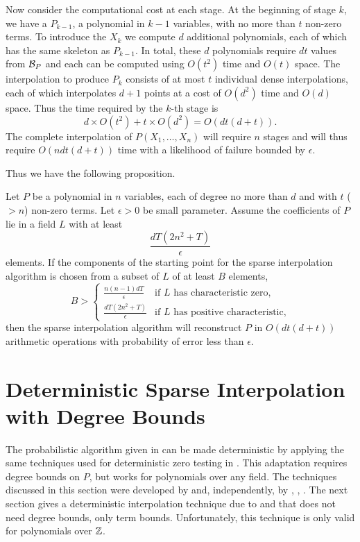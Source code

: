 Now consider the computational cost at each stage.  At the beginning
of stage $k$, we have a $P_{k-1}$, a polynomial in $k-1$ variables,
with no more than $t$ non-zero terms.  To introduce the $X_k$ we
compute $d$ additional polynomials, each of which has the same
skeleton as $P_{k-1}$.  In total, these $d$ polynomials require
$dt$ values from ${\cal B}_P$ and each can be computed using $O(t^2)$
time and $O(t)$ space.  The interpolation to produce $P_k$ consists of
at most $t$ individual dense interpolations, each of which 
interpolates $d+1$ points at a cost of $O(d^2)$ time and $O(d)$ space.
Thus the time required by the $k$-th stage is
\[
d \times O(t^2) + t \times O(d^2) = O(dt(d+t)).
\]
The complete interpolation of $P(X_1, \ldots, X_n)$ will require $n$ stages
and will thus require $O(ndt(d+t))$ time with a likelihood of failure
bounded by $\epsilon$.

Thus we have the following proposition.

\begin{proposition}
Let $P$ be a polynomial in $n$ variables, each of degree no more than $d$
and with $t$ ($> n$) non-zero terms.  Let $\epsilon>0$ be small
parameter.  Assume the coefficients of $P$ lie in
a field $L$ with at least 
\[
\frac{dT(2n^2 +T)}{\epsilon}
\]
elements.  If the components of the starting point for the sparse
interpolation algorithm is chosen from a subset of $L$ of at
least $B$ elements,
\[
B > \begin{cases}
\displaystyle\frac{n(n-1)dT}{\epsilon} & \text{if $L$ has characteristic zero,} \\
\displaystyle\frac{dT(2n^2 +T)}{\epsilon} & \text{if $L$ has positive characteristic,}
\end{cases}
\]
then the sparse interpolation algorithm will reconstruct $P$ in
$O(dt(d+t))$ arithmetic operations with probability of error less than
$\epsilon$.  
\end{proposition}

\section{Deterministic Sparse Interpolation with Degree Bounds}
\label{Interp:ZSparse:Sec}

The probabilistic algorithm given in  can
be made deterministic by applying the same techniques used for 
deterministic zero testing in . 
This adaptation requires degree bounds on $P$, but works for polynomials
over any field.  The techniques discussed in this section were
developed by {\Zippel} \cite{Zippel90} and, independently, by
{\Grigoriev}, {\Karpinski}, {\Singer} \cite{Grigoriev90}.  The next
section gives a deterministic interpolation technique due to {\BenOr}
and {\Tiwari} that does not need degree bounds, only term bounds.
Unfortunately, this technique is only valid for polynomials over $\mathbb{Z}$.

